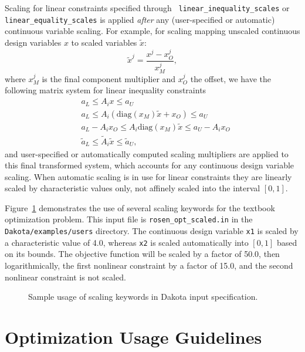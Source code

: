 Scaling for linear constraints specified through {\tt
linear\_inequality\_scales} or {\tt linear\_equality\_scales} is
applied {\em after} any (user-specified or automatic) continuous
variable scaling.  For example, for scaling mapping unscaled
continuous design variables $x$ to scaled variables $\tilde{x}$:
\[ \tilde{x}^j = \frac{x^j - x^j_O}{x^j_M}, \]
where $x^j_M$ is the final component multiplier and $x^j_O$ the
offset, we have the following matrix system for linear inequality
constraints
\begin{eqnarray*}
& a_L \leq A_i x \leq a_U \\
& a_L \leq A_i \left( \mathrm{diag}(x_M) \tilde{x} + x_O \right) \leq a_U \\
& a_L - A_i x_O \leq A_i \mathrm{diag}(x_M) \tilde{x} \leq a_U - A_i x_O \\
& \tilde{a}_L \leq \tilde{A}_i \tilde{x} \leq \tilde{a}_U,
\end{eqnarray*}
and user-specified or automatically computed scaling multipliers are
applied to this final transformed system, which accounts for any
continuous design variable scaling.  When automatic scaling is in use
for linear constraints they are linearly scaled by characteristic
values only, not affinely scaled into the interval $[0,1]$.

Figure~\ref{opt:additional:scaling:figure01} demonstrates the use of
several scaling keywords for the textbook optimization problem.
This input file is \texttt{rosen\_opt\_scaled.in} 
in the \texttt{Dakota/examples/users} directory.  The
continuous design variable {\tt x1} is scaled by a characteristic
value of 4.0, whereas {\tt x2} is scaled automatically into $[0,1]$
based on its bounds.  The objective function will be scaled by a
factor of 50.0, then logarithmically, the first nonlinear constraint
by a factor of 15.0, and the second nonlinear constraint is not
scaled.

\begin{figure}
\centering
\begin{bigbox}
\begin{small}
\end{small}
\end{bigbox}
\caption{Sample usage of scaling keywords in Dakota input specification.}
\label{opt:additional:scaling:figure01}
\end{figure}


\section{Optimization Usage Guidelines}\label{opt:usage}

